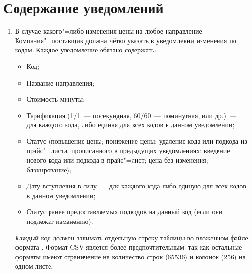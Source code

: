 \begin{Form}
\begin{enumerate}[label=\thesection.\arabic*.]
\begin{itemize}
        \end{itemize}

      \end{enumerate}
      
\section{Содержание уведомлений}
   
    \begin{enumerate}[label=\thesection.\arabic*.]
    \item В случае какого"=либо изменения цены на любое направление Компания"=поставщик
      должна чётко указать в уведомлении изменения по кодам. Каждое уведомление
      обязано содержать: 

      \begin{itemize}
      \item Код;
      \item Название направления;
      \item Стоимость минуты;
      \item Тарификация (1/1~--- посекундная, 60/60~--- поминутная, или др.)~---
        для каждого кода, либо единая для всех кодов в данном уведомлении; 
      \item Статус (повышение цены; понижение цены; удаление кода или подкода
        из прайс"=листа, прописанного в предыдущих уведомлениях; введение нового
        кода или подкода в прайс"=лист; цена без изменения; блокирование);
      \item Дату вступления в силу~--- для каждого кода либо единую для всех
        кодов в данном уведомлении;
      \item Статус ранее предоставляемых подкодов на данный код (если они подлежат
        изменению).
      \end{itemize}

    Каждый код должен занимать отдельную строку таблицы во вложенном файле
    формата  
    . Формат CSV явлется более предпочтительным,
    так как остальные форматы имеют ограничение на количество строк (65536) и колонок (256) на одном листе.


\end{enumerate}
\end{Form}
